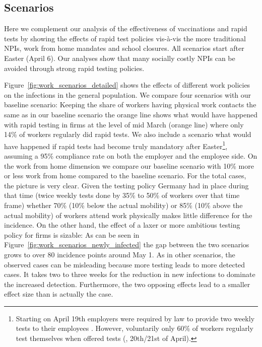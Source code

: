 \subsection{Scenarios}
\label{subsec:appendix_scenarios}

Here we complement our analysis of the effectiveness of vaccinations and rapid tests by
showing the effects of rapid test policies vis-à-vis the more traditional NPIs, work
from home mandates and school closures. All scenarios start after Easter (April 6). Our
analyses show that many socially costly NPIs can be avoided through strong rapid testing
policies.

Figure~\ref{fig:work_scenarios_detailed} shows the effects of different work policies on
the infections in the general population. We compare four scenarios with our baseline
scenario: Keeping the share of workers having physical work contacts the same as in our
baseline scenario the orange line shows what would have happened with rapid testing in
firms at the level of mid March (orange line) where only 14\% of workers regularly did
rapid tests. %
We also include a scenario what would have happened if rapid tests had become truly
mandatory after Easter\footnote{Starting on April 19th employers were required by law to
    provide two weekly tests to their employees \citep{Bundesanzeiger2021}. However,
    voluntarily only 60\% of workers regularly test themselves when offered tests
    (\cite{Betsch2021}, 20th/21st of April).}, assuming a 95\% compliance rate on both the
employer and the employee side. On the work from home dimension we compare our baseline
scenario with 10\% more or less work from home compared to the baseline scenario. For
the total cases, the picture is very clear. Given the testing policy Germany had in
place during that time (twice weekly tests done by 35\% to 50\% of workers over that
time frame) whether 70\% (10\% below the actual mobility) or 85\% (10\% above the actual
mobility) of workers attend work physically makes little difference for the incidence.
On the other hand, the effect of a laxer or more ambitious testing policy for firms is
sizable: As can be seen in Figure~\ref{fig:work_scenarios_newly_infected} the gap
between the two scenarios grows to over 80 incidence points around May 1.%
As in other scenarios, the observed cases can be misleading because more testing leads
to more detected cases. It takes two to three weeks for the reduction in new infections
to dominate the increased detection. Furthermore, the two opposing effects lead to a
smaller effect size than is actually the case.


